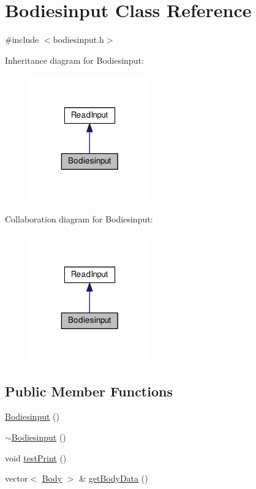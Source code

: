 \hypertarget{class_bodiesinput}{\section{Bodiesinput Class Reference}
\label{class_bodiesinput}
}


{\ttfamily \#include $<$bodiesinput.\-h$>$}



Inheritance diagram for Bodiesinput\-:\nopagebreak
\begin{figure}[H]
\begin{center}
\leavevmode
\includegraphics[width=148pt]{class_bodiesinput__inherit__graph}
\end{center}
\end{figure}


Collaboration diagram for Bodiesinput\-:\nopagebreak
\begin{figure}[H]
\begin{center}
\leavevmode
\includegraphics[width=148pt]{class_bodiesinput__coll__graph}
\end{center}
\end{figure}
\subsection*{Public Member Functions}
\begin{DoxyCompactItemize}
\item 
\hyperlink{class_bodiesinput_a978009fcccf310bddf3ecb2261f7b9ed}{Bodiesinput} ()
\item 
\hyperlink{class_bodiesinput_ab478797f356b2d02c7be5a04c5e08d69}{$\sim$\-Bodiesinput} ()
\item 
void \hyperlink{class_bodiesinput_ab4dda6e4b858b9e349b5cc9ba155b4cd}{test\-Print} ()
\item 
vector$<$ \hyperlink{class_body}{Body} $>$ \& \hyperlink{class_bodiesinput_a0526664103347cd11e2b6fc15e8f8e61}{get\-Body\-Data} ()
\end{DoxyCompactItemize}
